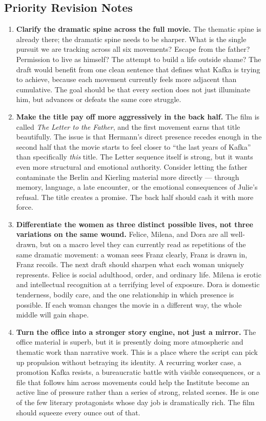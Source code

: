 \subsection{Priority Revision Notes}

\begin{enumerate}
\item \textbf{Clarify the dramatic spine across the full movie.} The thematic spine is already there; the dramatic spine needs to be sharper. What is the single pursuit we are tracking across all six movements? Escape from the father? Permission to live as himself? The attempt to build a life outside shame? The draft would benefit from one clean sentence that defines what Kafka is trying to achieve, because each movement currently feels more adjacent than cumulative. The goal should be that every section does not just illuminate him, but advances or defeats the same core struggle.

\item \textbf{Make the title pay off more aggressively in the back half.} The film is called \emph{The Letter to the Father}, and the first movement earns that title beautifully. The issue is that Hermann's direct presence recedes enough in the second half that the movie starts to feel closer to ``the last years of Kafka'' than specifically \emph{this} title. The Letter sequence itself is strong, but it wants even more structural and emotional authority. Consider letting the father contaminate the Berlin and Kierling material more directly --- through memory, language, a late encounter, or the emotional consequences of Julie's refusal. The title creates a promise. The back half should cash it with more force.

\item \textbf{Differentiate the women as three distinct possible lives, not three variations on the same wound.} Felice, Milena, and Dora are all well-drawn, but on a macro level they can currently read as repetitions of the same dramatic movement: a woman sees Franz clearly, Franz is drawn in, Franz recoils. The next draft should sharpen what each woman uniquely represents. Felice is social adulthood, order, and ordinary life. Milena is erotic and intellectual recognition at a terrifying level of exposure. Dora is domestic tenderness, bodily care, and the one relationship in which presence is possible. If each woman changes the movie in a different way, the whole middle will gain shape.

\item \textbf{Turn the office into a stronger story engine, not just a mirror.} The office material is superb, but it is presently doing more atmospheric and thematic work than narrative work. This is a place where the script can pick up propulsion without betraying its identity. A recurring worker case, a promotion Kafka resists, a bureaucratic battle with visible consequences, or a file that follows him across movements could help the Institute become an active line of pressure rather than a series of strong, related scenes. He is one of the few literary protagonists whose day job is dramatically rich. The film should squeeze every ounce out of that.


\end{enumerate}
